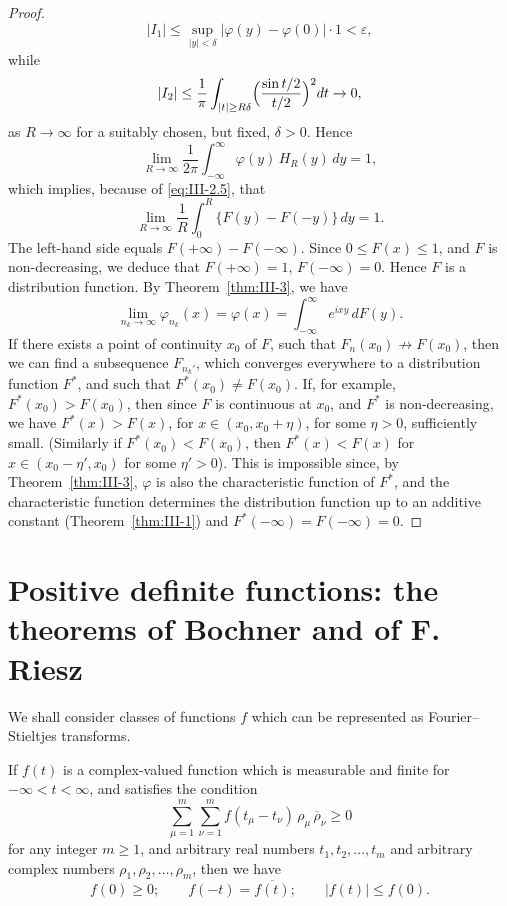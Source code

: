 \begin{proof}
\[
|I_{1}|\le\sup_{|y|<\delta}\bigl|\varphi(y)-\varphi(0)\bigr|\cdot1<\varepsilon,
\]
while
\[
|I_{2}|\le\frac{1}{\pi}\int_{|t|\ge R\delta}\Bigl(\frac{\sin t/2}{t/2}\Bigr)^{2}dt\to0,
\]
as $R\to\infty$ for a suitably chosen, but fixed, $\delta>0$. Hence
\[
\lim_{R\to\infty}\frac{1}{2\pi}\int_{-\infty}^{\infty}\varphi(y)\,H_{R}(y)\,dy=1,
\]
which implies, because of \eqref{eq:III-2.5}, that
\begin{equation}\tag{2.6}\label{eq:III-2.6}
\lim_{R\to\infty}\frac{1}{R}\int_{0}^{R}\bigl\{F(y)-F(-y)\bigr\}\,dy=1.
\end{equation}
The left-hand side equals $F(+\infty)-F(-\infty)$. Since $0\le F(x)\le1$, and $F$ is non-decreasing, we deduce that $F(+\infty)=1$, $F(-\infty)=0$. Hence $F$ is a distribution function. By Theorem~\ref{thm:III-3}, we have
\[
\lim_{n_{k}\to\infty}\varphi_{n_{k}}(x)=\varphi(x)=\int_{-\infty}^{\infty}e^{ixy}\,dF(y).
\]
If there exists a point of continuity $x_{0}$ of $F$, such that $F_{n}(x_{0})\not\to F(x_{0})$, then we can find a subsequence $F_{n_{k}'}$, which converges everywhere to a distribution function $F^{*}$, and such that $F^{*}(x_{0})\neq F(x_{0})$. If, for example, $F^{*}(x_{0})>F(x_{0})$, then since $F$ is continuous at $x_{0}$, and $F^{*}$ is non-decreasing, we have $F^{*}(x)>F(x)$, for $x\in(x_{0},x_{0}+\eta)$, for some $\eta>0$, sufficiently small. (Similarly if $F^{*}(x_{0})<F(x_{0})$, then $F^{*}(x)<F(x)$ for $x\in(x_{0}-\eta',x_{0})$ for some $\eta'>0$). This is impossible since, by Theorem~\ref{thm:III-3}, $\varphi$ is also the characteristic function of $F^{*}$, and the characteristic function determines the distribution function up to an additive constant (Theorem~\ref{thm:III-1}) and $F^{*}(-\infty)=F(-\infty)=0$.
\end{proof}

\section{Positive definite functions: the theorems of Bochner and of F. Riesz}
\label{sec:III-3}

We shall consider classes of functions $f$ which can be represented as Fourier--Stieltjes transforms.

\begin{lemma}\label{lem:III-1}
If $f(t)$ is a complex-valued function which is measurable and finite for $-\infty<t<\infty$, and satisfies the condition
\begin{equation}\tag{3.1}\label{eq:III-3.1}
\sum_{\mu=1}^{m}\sum_{\nu=1}^{m}f(t_{\mu}-t_{\nu})\,\rho_{\mu}\,\overline{\rho}_{\nu}\ge0
\end{equation}
for any integer $m\ge1$, and arbitrary real numbers $t_{1},t_{2},\dots,t_{m}$ and arbitrary complex numbers $\rho_{1},\rho_{2},\dots,\rho_{m}$, then we have
\begin{equation}\tag{3.2}\label{eq:III-3.2}
f(0)\ge0;\qquad f(-t)=\overline{f(t)};\qquad |f(t)|\le f(0).
\end{equation}
\end{lemma}

